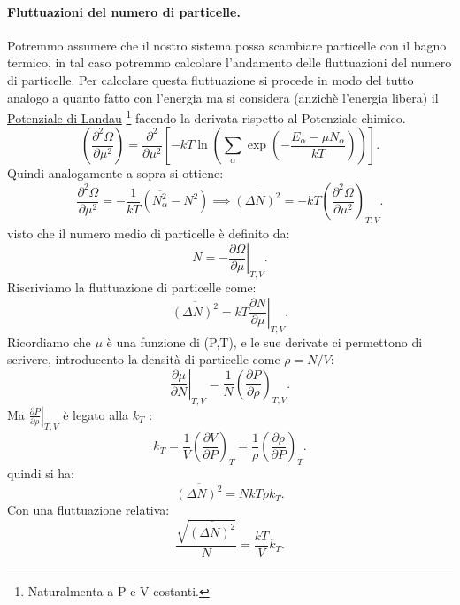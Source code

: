 \paragraph{Fluttuazioni del numero di particelle.}%
Potremmo assumere che il nostro sistema possa scambiare particelle con il bagno termico, in tal caso potremmo calcolare l'andamento delle fluttuazioni del numero di particelle. 
Per calcolare questa fluttuazione si procede in modo del tutto analogo a quanto fatto con l'energia ma si considera (anzichè l'energia libera) il \hyperref[eq:potenziale-Landau1]{Potenziale di Landau} \footnote{Naturalmenta a P e V costanti.} facendo la derivata rispetto al Potenziale chimico.
\[
	\left( \frac{\partial ^2 \Omega}{\partial \mu^2}  \right)  = \frac{\partial ^2}{\partial \mu^2} \left[ -kT \ln \left( \sum_{\alpha}^{} \exp\left( -\frac{E_{\alpha}-\mu N_{\alpha}}{kT} \right)  \right)  \right] 
.\] 
Quindi analogamente a sopra si ottiene:
\[
	\frac{\partial ^2\Omega}{\partial \mu^2} = -\frac{1}{kT}\left( \overline{N_{\alpha}^2}- N^2 \right) \implies
	\overline{\left( \Delta N \right) ^2} = - kT \left( \frac{\partial ^2\Omega}{\partial \mu^2}  \right) _{T,V}
.\] 
visto che il numero medio di particelle è definito da:
\[
	N = -\left.\frac{\partial \Omega}{\partial\mu} \right|_{T,V}
.\] 
Riscriviamo la fluttuazione di particelle come:
\[
	\overline{\left( \Delta N \right) ^2} = kT \left.\frac{\partial N}{\partial \mu} \right|_{T,V}
.\] 
Ricordiamo che $\mu$ è una funzione di (P,T), e le sue derivate ci permettono di scrivere, introducento la densità di particelle come $\rho = N /V$: 
\[
	\left.\frac{\partial \mu}{\partial N} \right|_{T,V} = \frac{1}{N}\left( \frac{\partial P}{\partial \rho}  \right) _{T,V}
.\] 
Ma $\left.\frac{\partial P}{\partial \rho} \right|_{T,V}$ è legato alla $k_{T}$ :
\[
	k_{T} = \frac{1}{V}\left( \frac{\partial V}{\partial P}  \right) _{T} = \frac{1}{\rho}\left( \frac{\partial \rho}{\partial P}  \right) _{T}
.\] 
quindi si ha:
\[
	\overline{\left( \Delta N \right) ^2}= NkT \rho k_{T}
.\]
Con una fluttuazione relativa:
\[
	\frac{\sqrt{\overline{\left( \Delta N \right) ^2}} }{N} = \frac{kT}{V}k_{T}
.\] 
